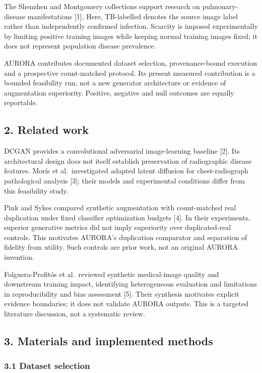 \documentclass[
]{article}
\begin{document}
The Shenzhen and Montgomery collections support research on
pulmonary-disease manifestations {[}1{]}. Here, TB-labelled denotes the
source image label rather than independently confirmed infection.
Scarcity is imposed experimentally by limiting positive training images
while keeping normal training images fixed; it does not represent
population disease prevalence.

AURORA contributes documented dataset selection, provenance-bound
execution and a prospective count-matched protocol. Its present measured
contribution is a bounded feasibility run, not a new generator
architecture or evidence of augmentation superiority. Positive, negative
and null outcomes are equally reportable.

\subsection{2. Related work}\label{related-work}

DCGAN provides a convolutional adversarial image-learning baseline
{[}2{]}. Its architectural design does not itself establish preservation
of radiographic disease features. Morís et al.~investigated adapted
latent diffusion for chest-radiograph pathological analysis {[}3{]};
their models and experimental conditions differ from this feasibility
study.

Pink and Sykes compared synthetic augmentation with count-matched real
duplication under fixed classifier optimization budgets {[}4{]}. In
their experiments, superior generative metrics did not imply superiority
over duplicated-real controls. This motivates AURORA's duplication
comparator and separation of fidelity from utility. Such controls are
prior work, not an original AURORA invention.

Folguera-Profitós et al.~reviewed synthetic medical-image quality and
downstream training impact, identifying heterogeneous evaluation and
limitations in reproducibility and bias assessment {[}5{]}. Their
synthesis motivates explicit evidence boundaries; it does not validate
AURORA outputs. This is a targeted literature discussion, not a
systematic review.

\subsection{3. Materials and implemented
methods}\label{materials-and-implemented-methods}

\subsubsection{3.1 Dataset selection}\label{dataset-selection}
\end{document}
